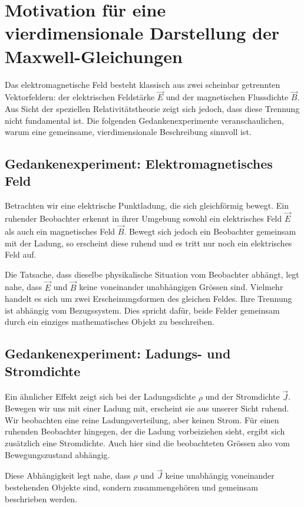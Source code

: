 \section{Motivation für eine vierdimensionale Darstellung der Maxwell-Gleichungen}
\label{maxwell:motivation}

Das elektromagnetische Feld besteht klassisch aus zwei scheinbar getrennten Vektorfeldern: der elektrischen Feldstärke \( \vec{E} \) und der magnetischen Flussdichte \( \vec{B} \). Aus Sicht der speziellen Relativitätstheorie zeigt sich jedoch, dass diese Trennung nicht fundamental ist. Die folgenden Gedankenexperimente veranschaulichen, warum eine gemeinsame, vierdimensionale Beschreibung sinnvoll ist.

\subsection{Gedankenexperiment: Elektromagnetisches Feld}

Betrachten wir eine elektrische Punktladung, die sich gleichförmig bewegt.
Ein ruhender Beobachter erkennt in ihrer Umgebung sowohl ein elektrisches Feld \( \vec{E} \) als auch ein magnetisches Feld \( \vec{B} \).
Bewegt sich jedoch ein Beobachter gemeinsam mit der Ladung, so erscheint diese ruhend und es tritt nur noch ein elektrisches Feld auf. 

Die Tatsache, dass dieselbe physikalische Situation vom Beobachter abhängt, legt nahe, dass \( \vec{E} \) und \( \vec{B} \) keine voneinander unabhängigen Grössen sind.
Vielmehr handelt es sich um zwei Erscheinungsformen des gleichen Feldes.
Ihre Trennung ist abhängig vom Bezugssystem.
Dies spricht dafür, beide Felder gemeinsam durch ein einziges mathematisches Objekt zu beschreiben.

\subsection{Gedankenexperiment: Ladungs- und Stromdichte}

Ein ähnlicher Effekt zeigt sich bei der Ladungsdichte \( \rho \) und der Stromdichte \( \vec{J} \).
Bewegen wir uns mit einer Ladung mit, erscheint sie aus unserer Sicht ruhend.
Wir beobachten eine reine Ladungsverteilung, aber keinen Strom.
Für einen ruhenden Beobachter hingegen, der die Ladung vorbeiziehen sieht, ergibt sich zusätzlich eine Stromdichte.
Auch hier sind die beobachteten Grössen also vom Bewegungszustand abhängig.

Diese Abhängigkeit legt nahe, dass \( \rho \) und \( \vec{J} \) keine unabhängig voneinander bestehenden Objekte sind, sondern zusammengehören und gemeinsam beschrieben werden.

